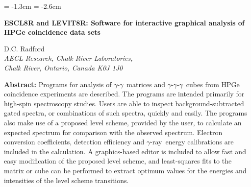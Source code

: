 \setlength{\textwidth}{16.5cm}
 \setlength{\textheight}{24cm}
 \hoffset = -1.3cm
 \voffset = -2.6cm
 \setlength{\parskip}{0.05in}
 \setlength{\parindent}{1cm}
 \setlength{\unitlength}{1mm}
 \pagestyle{myheadings}
 \markright{}

\newcommand{\gd}{$^{154}$Gd}
\newcommand{\dy}{$^{156}$Dy}
\newcommand{\ho}{$^{157}$Ho}
\newcommand{\er}{$^{158}$Er}
\newcommand{\yb}{$^{160}$Yb}
\newcommand{\sn}{$^{124}$Sn}
\newcommand{\cl}{$^{37}$Cl}

\newcommand{\gray}{$\gamma$ ray}
\newcommand{\grays}{$\gamma$ rays}
\newcommand{\ghray}{$\gamma$-ray}
\newcommand{\ghg}{$\gamma$-$\gamma$}
\newcommand{\ghghg}{$\gamma$-$\gamma$-$\gamma$}



\begin{center}
\large
{\bf           ESCL8R and LEVIT8R: Software for interactive graphical
                      analysis of HPGe coincidence data sets}
\normalsize
\end{center}
\vspace{5mm}
\begin{center}
                                D.C. Radford\\
{\em                AECL Research, Chalk River Laboratories,\\
                     Chalk River, Ontario, Canada K0J 1J0\\}
\end{center}
\vspace{8mm}
\setlength{\baselineskip}{4mm}
\begin{minipage}[t]{16.5cm}
{\bf Abstract: }
Programs for analysis of \ghg\ matrices and \ghghg\ cubes from HPGe coincidence
experiments are described. The programs are intended primarily for high-spin
spectroscopy studies. Users are able to inspect background-subtracted gated
spectra, or combinations of such spectra, quickly  and easily. The programs
also make use of a proposed level scheme, provided by the user, to calculate an
expected spectrum for comparison with the observed spectrum. Electron
conversion coefficients, detection efficiency and \ghray\ energy calibrations
are included in the calculation. A graphics-based editor is included to allow
fast and easy modification of the proposed level scheme, and least-squares fits
to the matrix or cube can be performed to extract optimum values for the
energies and intensities of the level scheme transitions.

\end{minipage}

